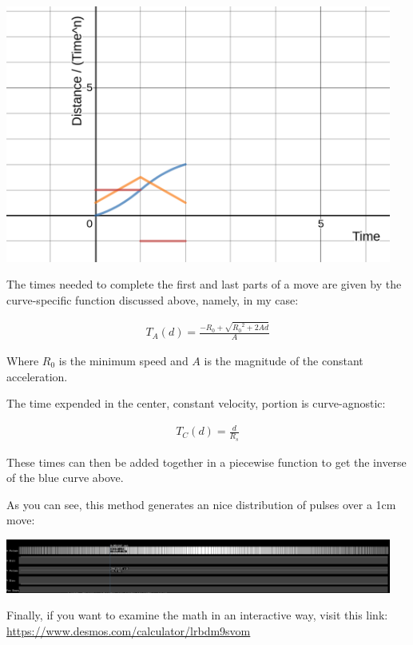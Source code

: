 \documentclass{article}
\begin{document}
\begin{center}
  \includegraphics[width=5in]{short_move.png}
\end{center}

The times needed to complete the first and last parts of a move are given by the curve-specific function discussed above, namely, in my case:

\begin{align*}
  T_A(d) = \frac{-R_0 + \sqrt{{R_0}^2 + 2Ad}}{A}
\end{align*}

Where $R_0$ is the minimum speed and $A$ is the magnitude of the constant acceleration.

The time expended in the center, constant velocity, portion is curve-agnostic:

\begin{align*}
  T_C(d) = \frac{d}{R_s}
\end{align*}

These times can then be added together in a piecewise function to get the inverse of the blue curve above.

As you can see, this method generates an nice distribution of pulses over a 1cm move:

\begin{center}
  \includegraphics[width=5in]{accel.png}
\end{center}

Finally, if you want to examine the math in an interactive way, visit this link: \url{https://www.desmos.com/calculator/lrbdm9svom}
\end{document}
